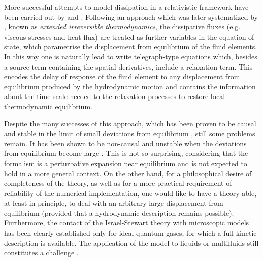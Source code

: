 \documentclass[useAMS,usenatbib,prd,twocolumn,nofootinbib]{revtex4-1}
\begin{document}
More successful attempts to model dissipation in a relativistic framework have been carried out by \citet{Stewart_1977} and \citet{Israel_Stewart_1979}. Following an approach which was later systematized by \citet{Jou_Extended}, known as \textit{extended irreversible thermodynamics}, the dissipative fluxes (e.g. viscous stresses and heat flux) are treated as further variables in the equation of state, which parametrise the displacement from equilibrium of the fluid elements. In this way one is naturally lead to write telegraph-type equations which, besides a source term containing the spatial derivatives, include a relaxation term. This encodes the delay of response of the fluid element to any displacement from equilibrium produced by the hydrodynamic motion and contains the information about the time-scale needed to the relaxation processes to restore local thermodynamic equilibrium.

Despite the many successes of this approach, which has been proven to be causal and stable in the limit of small deviations from equilibrium \citep{Hishcock1983}, still some problems remain. It has been shown to be non-causal and unstable when the deviations from equilibrium become large \citep{Hishcock1988}. This is not so surprising, considering that the formalism is a perturbative expansion near equilibrium and is not expected to hold in a more general context. On the other hand, for a philosophical desire of completeness of the theory, as well as for a more practical requirement of reliability of the numerical implementation, one would like to have a theory able, at least in principle, to deal with an arbitrary large displacement from equilibrium (provided that a hydrodynamic description remains possible). Furthermore, the contact of the Israel-Stewart theory with microscopic models has been clearly established only for ideal quantum gases, for which a full kinetic description is available. The application of the model to liquids or multifluids still constitutes a challenge \citep{andersson2020relativistic}.    
\end{document}
